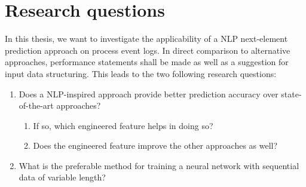 \newpage
\section{Research questions}\label{sec:intro:objective}
In this thesis, we want to investigate the applicability of a NLP next-element prediction approach on process event logs. In direct comparison to alternative approaches, performance statements shall be made as well as a suggestion for input data structuring. This leads to the two following research questions:

\begin{enumerate}
    \item Does a NLP-inspired approach provide better prediction accuracy over state-of-the-art approaches?
    \begin{enumerate}
        \item If so, which engineered feature helps in doing so?
        \item Does the engineered feature improve the other approaches as well?
    \end{enumerate}
    \item What is the preferable method for training a neural network with sequential data of variable length?
\end{enumerate}